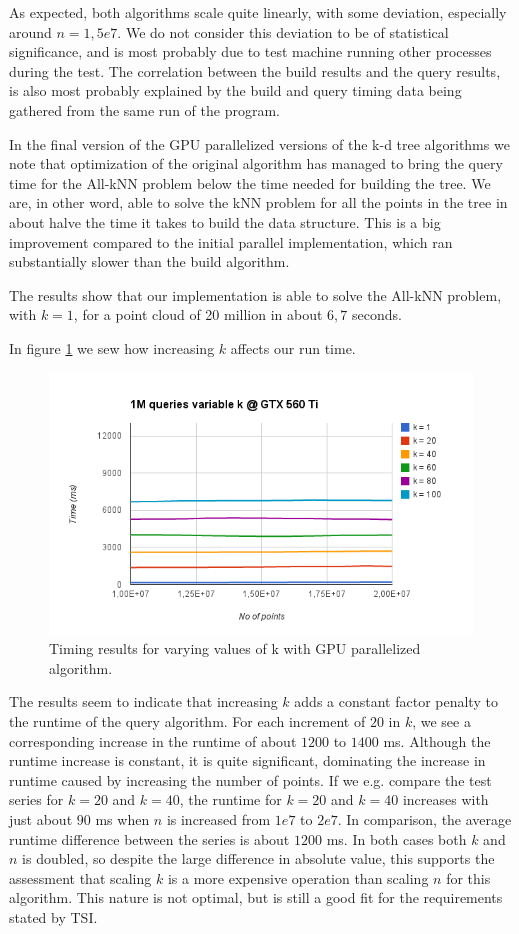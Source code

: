As expected, both algorithms scale quite linearly, with some deviation, especially around $n=1,5e7$. We do not consider this deviation to be of statistical significance, and is most probably due to test machine running other processes during the test. The correlation between the build results and the query results, is also most probably explained by the build and query timing data being gathered from the same run of the program.

In the final version of the GPU parallelized versions of the k-d tree algorithms we note that optimization of the original algorithm has managed to bring the query time for the All-kNN problem below the time needed for building the tree. We are, in other word, able to solve the kNN problem for all the points in the tree in about halve the time it takes to build the data structure. This is a big improvement compared to the initial parallel implementation, which ran substantially slower than the build algorithm.

The results show that our implementation is able to solve the All-kNN problem, with $k=1$, for a point cloud of 20 million in about $6,7$ seconds.

In figure \ref{fig:v17-gpu-variable-k} we sew how increasing $k$ affects our run time.

\begin{figure}[ht!]
    \centering
    \includegraphics[width=120mm]{../gfx/v17-gpu-variable-k.png}
    \caption{Timing results for varying values of k with GPU parallelized algorithm.}
    \label{fig:v17-gpu-variable-k}
\end{figure}

The results seem to indicate that increasing $k$ adds a constant factor penalty to the runtime of the query algorithm. For each increment of $20$ in $k$, we see a corresponding increase in the runtime of about $1200$ to $1400$ ms. Although the runtime increase is constant, it is quite significant, dominating the increase in runtime caused by increasing the number of points. If we e.g. compare the test series for $k=20$ and $k=40$, the runtime for $k=20$ and $k=40$ increases with just about $90$ ms when $n$ is increased from $1e7$ to $2e7$. In comparison, the average runtime difference between the series is about $1200$ ms. In both cases both $k$ and $n$ is doubled, so despite the large difference in absolute value, this supports the assessment that scaling $k$ is a more expensive operation than scaling $n$ for this algorithm. This nature is not optimal, but is still a good fit for the requirements stated by TSI.

